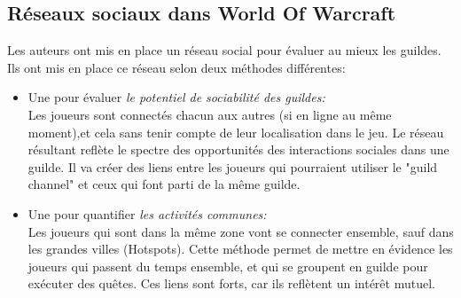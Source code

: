 \documentclass[11pt,a4paper]{article}
\begin{document}
\subsection{Réseaux sociaux dans World Of Warcraft} 
Les auteurs ont mis en place un réseau social pour évaluer au mieux les guildes. Ils ont mis en place ce réseau selon deux méthodes différentes:
\begin{itemize}
	\renewcommand{\labelitemi}{$\bullet$}
	\item Une pour évaluer \textit{le potentiel de sociabilité des guildes:}\\
	Les joueurs sont connectés chacun aux autres (si en ligne au même moment),et cela sans tenir compte de leur localisation dans le jeu. Le réseau résultant reflète le spectre des opportunités des interactions sociales dans une guilde. Il va créer des liens entre les joueurs qui pourraient utiliser le "guild channel" et ceux qui font parti de la même guilde.
	\item Une pour quantifier \textit{les activités communes:}\\
	Les joueurs qui sont dans la même zone vont se connecter ensemble, sauf dans les grandes villes (Hotspots). Cette méthode permet de mettre en évidence les joueurs qui passent du temps ensemble, et qui se groupent en guilde pour exécuter des quêtes. Ces liens sont forts, car ils reflètent un intérêt mutuel. 
\end{itemize}
\end{document}
